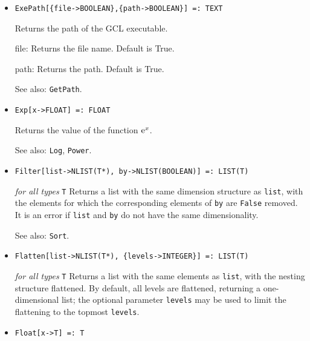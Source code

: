 \begin{itemize}
\item{}
\protect \large \begin{verbatim}
ExePath[{file->BOOLEAN},{path->BOOLEAN}] =: TEXT 
\end{verbatim} \normalsize

\bd
Returns the path of the GCL executable. 
\bd
\item [file:] Returns the file name.  Default is True.  
\item [path:] Returns the path.  Default is True. 
\ed
\item [See also:] \verb+GetPath+.
\ed

\item{}
\protect \large \begin{verbatim}
Exp[x->FLOAT] =: FLOAT
\end{verbatim} \normalsize

\bd
Returns the value of the function ${\rm e}^{x}$.
\item [See also:] \verb+Log+, \verb+Power+.
\ed



\item{}
\protect \large \begin{verbatim}
Filter[list->NLIST(T*), by->NLIST(BOOLEAN)] =: LIST(T)
\end{verbatim} \normalsize

{\it for all types} {\tt T}
\bd
Returns a list with the same dimension structure as \verb+list+, with the
elements for which the corresponding elements of \verb+by+ are \verb+False+
removed.  It is an error if \verb+list+ and \verb+by+ do not have the same
dimensionality.
\item [See also:] \verb+Sort+.
\ed

\item{}
\protect \large \begin{verbatim}
Flatten[list->NLIST(T*), {levels->INTEGER}] =: LIST(T)
\end{verbatim} \normalsize

{\it for all types} {\tt T}
\bd
Returns a list with the same elements as \verb+list+, with the nesting
structure flattened.  By default, all levels are flattened, returning
a one-dimensional list; the optional parameter \verb+levels+ may be
used to limit the flattening to the topmost \verb+levels+.
\ed

\item{}
\protect \large \begin{verbatim}
Float[x->T] =: T
\end{verbatim} \normalsize


\end{itemize}
